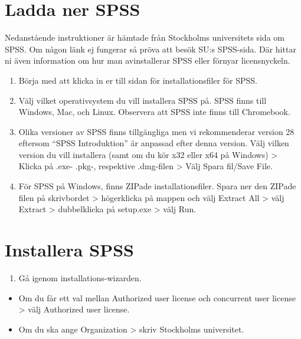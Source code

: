 \documentclass[
]{book}
\providecommand{\tightlist}{%
  \setlength{\itemsep}{0pt}\setlength{\parskip}{0pt}}
\begin{document}
\hypertarget{ladda-ner-spss}{%
\section{Ladda ner SPSS}\label{ladda-ner-spss}}

Nedanstående instruktioner är hämtade från Stockholms universitets sida om SPSS. Om någon länk ej fungerar så pröva att besök SU:s SPSS-sida. Där hittar ni även information om hur man avinstallerar SPSS eller förnyar licensnyckeln.

\begin{enumerate}
\def\labelenumi{\arabic{enumi}.}
\item
  Börja med att klicka in er till sidan för installationsfiler för SPSS.
\item
  Välj vilket operativsystem du vill installera SPSS på. SPSS finns till Windows, Mac, och Linux. Observera att SPSS inte finns till Chromebook.
\item
  Olika versioner av SPSS finns tillgängliga men vi rekommenderar version 28 eftersom ``SPSS Introduktion'' är anpassad efter denna version. Välj vilken version du vill installera (samt om du kör x32 eller x64 på Windows) \textgreater{} Klicka på .exe- .pkg-, respektive .dmg-filen \textgreater{} Välj Spara fil/Save File.
\item
  För SPSS på Windows, finns ZIPade installationsfiler. Spara ner den ZIPade filen på skrivbordet \textgreater{} högerklicka på mappen och välj Extract All \textgreater{} välj Extract \textgreater{} dubbelklicka på setup.exe \textgreater{} välj Run.
\end{enumerate}

\hypertarget{installera-spss}{%
\section{Installera SPSS}\label{installera-spss}}

\begin{enumerate}
\def\labelenumi{\arabic{enumi}.}
\tightlist
\item
  Gå igenom installations-wizarden.
\end{enumerate}

\begin{itemize}
\item
  Om du får ett val mellan Authorized user license och concurrent user license \textgreater{} välj Authorized user license.
\item
  Om du ska ange Organization \textgreater{} skriv Stockholms universitet.
\end{itemize}
\end{document}
